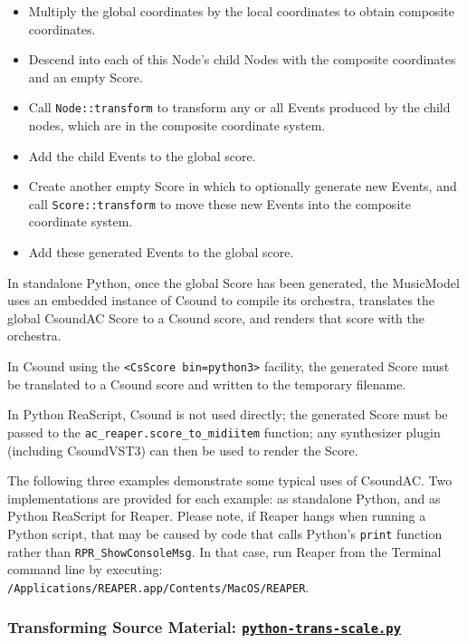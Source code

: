 \documentclass[letterpaper,10pt,DIV=12,parskip=half]{scrartcl}
\begin{document}
\begin{itemize}
\item Multiply the global coordinates by the local coordinates to obtain composite coordinates.
\item Descend into each of this Node's child Nodes with the composite coordinates and an empty Score.
\item Call \lstinline|Node::transform| to transform any or all Events produced by the child nodes, which are in the composite coordinate system.
\item Add the child Events to the global score.
\item Create another empty Score in which to optionally generate new Events, and call \lstinline|Score::transform| to move these new Events into the composite coordinate system.
\item Add these generated Events to the global score.
\end{itemize}

In standalone Python, once the global Score has been generated, the MusicModel uses an embedded instance of Csound to compile its orchestra, translates the global CsoundAC Score to a Csound score, and renders that score with the orchestra.

In Csound using the \lstinline|<CsScore bin=python3>| facility, the generated Score must be translated to a Csound score and written to the temporary filename.

In Python ReaScript, Csound is not used directly; the generated Score must be passed to the \lstinline|ac_reaper.score_to_midiitem| function; any synthesizer plugin (including CsoundVST3) can then be used to render the Score.

The following three examples demonstrate some typical uses of CsoundAC. Two implementations are provided for each example: as standalone Python, and as Python ReaScript for Reaper. Please note, if Reaper hangs when running a Python script, that may be caused by code that calls Python's \lstinline|print| function rather than \lstinline|RPR_ShowConsoleMsg|. In that case, run Reaper from the Terminal command line by executing: \lstinline|/Applications/REAPER.app/Contents/MacOS/REAPER|.

\subsubsection{Transforming Source Material: \href{https://github.com/gogins/csound-ac/blob/master/user-guide/python-trans-scale.py}{\lstinline|python-trans-scale.py|}}
\end{document}

